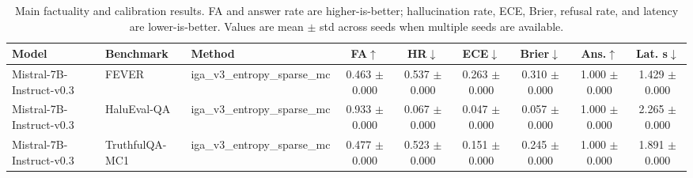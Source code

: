 \begin{table}[t]
\centering
\caption{Main factuality and calibration results. FA and answer rate are higher-is-better; hallucination rate, ECE, Brier, refusal rate, and latency are lower-is-better. Values are mean $\pm$ std across seeds when multiple seeds are available.}
\label{tab:main_results}
\small
\begin{tabular}{lllcccccc}
\toprule
Model & Benchmark & Method & FA$\uparrow$ & HR$\downarrow$ & ECE$\downarrow$ & Brier$\downarrow$ & Ans.$\uparrow$ & Lat. s$\downarrow$ \\
\midrule
Mistral-7B-Instruct-v0.3 & FEVER & iga\_v3\_entropy\_sparse\_mc & 0.463 $\pm$ 0.000 & 0.537 $\pm$ 0.000 & 0.263 $\pm$ 0.000 & 0.310 $\pm$ 0.000 & 1.000 $\pm$ 0.000 & 1.429 $\pm$ 0.000 \\
Mistral-7B-Instruct-v0.3 & HaluEval-QA & iga\_v3\_entropy\_sparse\_mc & 0.933 $\pm$ 0.000 & 0.067 $\pm$ 0.000 & 0.047 $\pm$ 0.000 & 0.057 $\pm$ 0.000 & 1.000 $\pm$ 0.000 & 2.265 $\pm$ 0.000 \\
Mistral-7B-Instruct-v0.3 & TruthfulQA-MC1 & iga\_v3\_entropy\_sparse\_mc & 0.477 $\pm$ 0.000 & 0.523 $\pm$ 0.000 & 0.151 $\pm$ 0.000 & 0.245 $\pm$ 0.000 & 1.000 $\pm$ 0.000 & 1.891 $\pm$ 0.000 \\
\bottomrule
\end{tabular}
\end{table}
